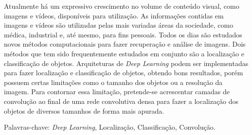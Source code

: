 \begin{resumo}
\vspace{-1cm}

\onehalfspacing

\noindent 
   Atualmente há um expressivo crescimento no volume de conteúdo visual, como imagens e vídeos, disponíveis para utilização. As informações contidas em imagens e vídeos são utilizadas pelas mais variadas áreas da sociedade, como médica, industrial e, até mesmo, para fins pessoais. Todos os dias são estudados novos métodos computacionais para fazer recuperação e análise de imagens. Dois métodos que tem sido frequentemente estudados em conjunto são a localização e classificação de objetos. Arquiteturas de \textit{Deep Learning} podem ser implementadas para fazer localização e classificação de objetos, obtendo bons resultados, porém possuem certas limitações como o tamanho dos objetos ou a resolução da imagem. Para contornar essa limitação, pretende-se acrescentar camadas de convolução ao final de uma rede convolutiva densa para fazer a localização dos objetos de diversos tamanhos de forma mais apurada. %

\vspace*{.75cm}

\noindent Palavras-chave: \textit{Deep Learning}, Localização, Classificação, Convolução.\\ %

\end{resumo}